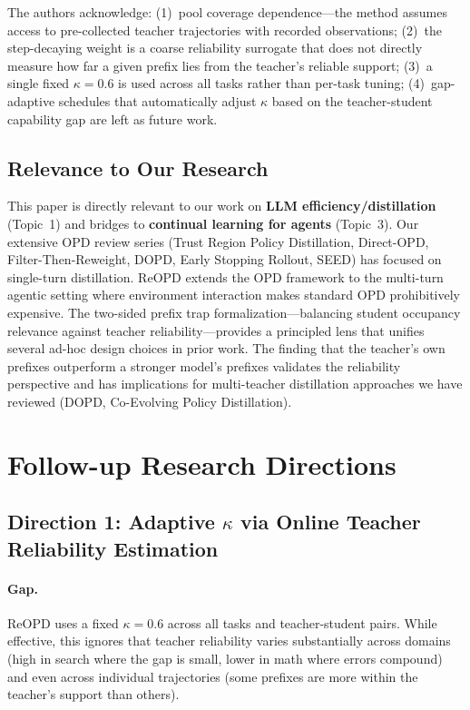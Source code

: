 \documentclass[11pt,a4paper]{article}
\begin{document}
The authors acknowledge: (1)~pool coverage dependence---the method assumes access to pre-collected teacher trajectories with recorded observations; (2)~the step-decaying weight is a coarse reliability surrogate that does not directly measure how far a given prefix lies from the teacher's reliable support; (3)~a single fixed $\kappa = 0.6$ is used across all tasks rather than per-task tuning; (4)~gap-adaptive schedules that automatically adjust $\kappa$ based on the teacher-student capability gap are left as future work.

\subsection{Relevance to Our Research}

This paper is directly relevant to our work on \textbf{LLM efficiency/distillation} (Topic~1) and bridges to \textbf{continual learning for agents} (Topic~3). Our extensive OPD review series (Trust Region Policy Distillation, Direct-OPD, Filter-Then-Reweight, DOPD, Early Stopping Rollout, SEED) has focused on single-turn distillation. ReOPD extends the OPD framework to the multi-turn agentic setting where environment interaction makes standard OPD prohibitively expensive. The two-sided prefix trap formalization---balancing student occupancy relevance against teacher reliability---provides a principled lens that unifies several ad-hoc design choices in prior work. The finding that the teacher's own prefixes outperform a stronger model's prefixes validates the reliability perspective and has implications for multi-teacher distillation approaches we have reviewed (DOPD, Co-Evolving Policy Distillation).

\section{Follow-up Research Directions}

\subsection{Direction 1: Adaptive $\kappa$ via Online Teacher Reliability Estimation}

\paragraph{Gap.}
ReOPD uses a fixed $\kappa = 0.6$ across all tasks and teacher-student pairs. While effective, this ignores that teacher reliability varies substantially across domains (high in search where the gap is small, lower in math where errors compound) and even across individual trajectories (some prefixes are more within the teacher's support than others).
\end{document}
